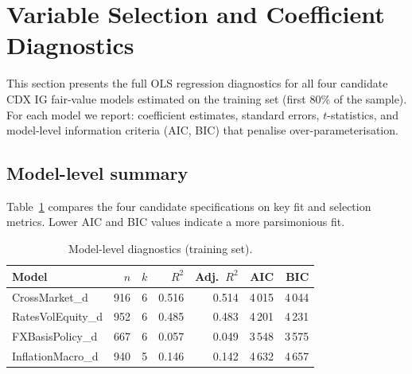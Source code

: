 \section{Variable Selection and Coefficient Diagnostics}

This section presents the full OLS regression diagnostics for all four
candidate CDX IG fair-value models estimated on the training set (first 80\% of
the sample). For each model we report: coefficient estimates, standard errors,
\(t\)-statistics, and model-level information criteria (AIC, BIC) that penalise
over-parameterisation.

\subsection*{Model-level summary}

Table~\ref{tab:model_summary} compares the four candidate specifications on
key fit and selection metrics. Lower AIC and BIC values indicate a more
parsimonious fit.

\begin{table}[H]
\centering
\small
\caption{Model-level diagnostics (training set).}
\label{tab:model_summary}
\begin{tabular}{lrrrrrr}
\toprule
Model & \(n\) & \(k\) & \(R^2\) & Adj.\ \(R^2\) & AIC & BIC \\
\midrule
CrossMarket\_d       & 916 & 6 & 0.516 & 0.514 & 4\,015 & 4\,044 \\
RatesVolEquity\_d    & 952 & 6 & 0.485 & 0.483 & 4\,201 & 4\,231 \\
FXBasisPolicy\_d     & 667 & 6 & 0.057 & 0.049 & 3\,548 & 3\,575 \\
InflationMacro\_d    & 940 & 5 & 0.146 & 0.142 & 4\,632 & 4\,657 \\
\bottomrule
\end{tabular}
\end{table}


